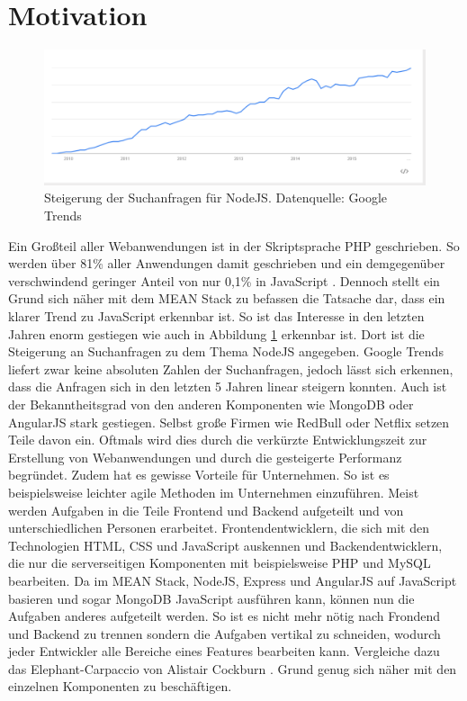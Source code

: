 \section{Motivation}
\label{motivation}


\begin{figure}[t]
	\centering
	\includegraphics[width=0.7\linewidth]{figures/NodeJS.png}
	\caption{Steigerung der Suchanfragen für NodeJS. Datenquelle: Google Trends \cite{googleTrends:nodeJS}}
	\label{f:motivation:nodejs}
\end{figure}


Ein Großteil aller Webanwendungen ist in der Skriptsprache PHP geschrieben. 
So werden über 81\% aller Anwendungen damit geschrieben und ein demgegenüber verschwindend geringer Anteil von nur 0,1\% in JavaScript \cite{w3techs:serversidePLUsage}.
Dennoch stellt ein Grund sich näher mit dem MEAN Stack zu befassen die Tatsache dar, dass ein klarer Trend zu JavaScript erkennbar ist.
So ist das Interesse in den letzten Jahren enorm gestiegen wie auch in Abbildung \ref{f:motivation:nodejs} erkennbar ist.
Dort ist die Steigerung an Suchanfragen zu dem Thema NodeJS angegeben.
Google Trends liefert zwar keine absoluten Zahlen der Suchanfragen, jedoch lässt sich erkennen, dass die Anfragen sich in den letzten 5 Jahren linear steigern konnten. 
Auch ist der Bekanntheitsgrad von den anderen Komponenten wie MongoDB oder AngularJS stark gestiegen.
Selbst große Firmen wie RedBull oder Netflix setzen Teile davon ein.
Oftmals wird dies durch die verkürzte Entwicklungszeit zur Erstellung von Webanwendungen und durch die gesteigerte Performanz begründet.
Zudem hat es gewisse Vorteile für Unternehmen. So ist es beispielsweise leichter agile Methoden im Unternehmen einzuführen.
Meist werden Aufgaben in die Teile Frontend und Backend aufgeteilt und von unterschiedlichen Personen erarbeitet.
Frontendentwicklern, die sich mit den Technologien HTML, CSS und JavaScript auskennen und Backendentwicklern, die nur die serverseitigen Komponenten mit beispielsweise PHP und MySQL bearbeiten.
Da im MEAN Stack, NodeJS, Express und AngularJS auf JavaScript basieren und sogar MongoDB JavaScript ausführen kann, können nun die Aufgaben anderes aufgeteilt werden.
So ist es nicht mehr nötig nach Frondend und Backend zu trennen sondern die Aufgaben vertikal zu schneiden, wodurch jeder Entwickler alle Bereiche eines Features bearbeiten kann.
Vergleiche dazu das Elephant-Carpaccio von Alistair Cockburn \cite{cockburn:elephant}. 
Grund genug sich näher mit den einzelnen Komponenten zu beschäftigen.
